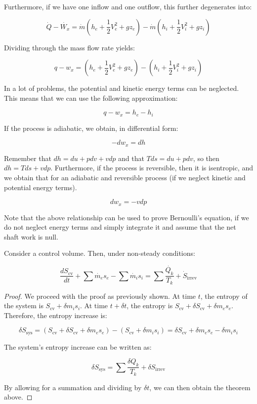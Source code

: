 \documentclass{article}
\begin{document}
Furthermore, if we have one inflow and one outflow, this further degenerates into:

\[ \dot{Q} - \dot{W_x} = \dot{m}(h_e + \frac{1}{2}V_e^2 + gz_e) - \dot{m}(h_i + \frac{1}{2}V_i^2 + gz_i) \]

Dividing through the mass flow rate yields:

\[ q - w_x = (h_e + \frac{1}{2}V_e^2 + gz_e) - (h_i + \frac{1}{2}V_i^2 + gz_i)\]

In a lot of problems, the potential and kinetic energy terms can be neglected. This means that we can use the following approximation:

\[ q - w_x = h_e - h_i \]

If the process is adiabatic, we obtain, in differential form:

\[ -dw_x = dh \]

Remember that $dh = du + pdv + vdp$ and that $Tds = du + pdv$, so then $dh = Tds + vdp$. Furthermore, if the process is reversible, then it is isentropic, and we obtain that for an adiabatic and reversible process (if we neglect kinetic and potential energy terms).

\[ dw_x = -vdp \]

Note that the above relationship can be used to prove Bernoulli's equation, if we do not neglect energy terms and simply integrate it and assume that the net shaft work is null.

\begin{theorem}
    Consider a control volume. Then, under non-steady conditions:

    \[ \frac{dS_\text{cv}}{dt} + \sum \dot{m_e}s_e - \sum \dot{m_i}s_i = \sum \frac{\dot{Q_k}}{T_k} + \dot{S}_\text{irrev} \]
\end{theorem}

\begin{proof}
    We proceed with the proof as previously shown. At time $t$, the entropy of the system is $S_\text{cv} + \delta m_is_i$. At time $t + \delta t$, the entropy is $S_\text{cv} + \delta S_\text{cv} + \delta m_es_e$. Therefore, the entropy increase is:

    \[ \delta S_\text{sys} = (S_\text{cv} + \delta S_\text{cv} + \delta m_es_e) - (S_\text{cv} + \delta m_is_i) = \delta S_\text{cv} + \delta m_es_e - \delta m_is_i\]

    The system's entropy increase can be written as:

    \[ \delta S_\text{sys} = \sum \frac{\delta Q_k}{T_k} + \delta S_\text{irrev} \]

    By allowing for a summation and dividing by $\delta t$, we can then obtain the theorem above.
\end{proof}
\end{document}
